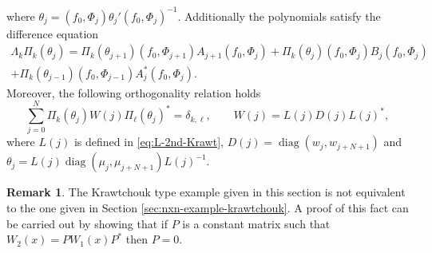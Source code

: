 \documentclass[a4paper,reqno]{amsart}
\DeclareMathOperator{\diag}{diag}
\theoremstyle{definition}
\newtheorem{remark}[theorem]{Remark}
\numberwithin{equation}{section}
\begin{document}
where $\theta_j=( f_0, \Phi_j) \theta_j'( f_0, \Phi_j)^{-1}.$ Additionally the polynomials satisfy  the difference equation 
\begin{multline}
\Lambda_k\Pi_k(\theta_j)=\Pi_k(\theta_{j+1})(f_0,\Phi_{j+1})A_{j+1}(f_0,\Phi_j)+\Pi_k(\theta_{j})(f_0,\Phi_{j})B_{j}(f_0,\Phi_j)\\+\Pi_k(\theta_{j-1})(f_0,\Phi_{j-1})A_{j}^\ast(f_0,\Phi_j). 
\end{multline}
Moreover, the following orthogonality relation holds
\begin{equation}
    \sum_{j=0}^N \Pi_{k}(\theta_j)W(j)\Pi_{\ell}(\theta_j)^\ast=\delta_{k,\ell}, \qquad W(j)=L(j)D(j)L(j)^\ast,
\end{equation} 
where $L(j)$ is defined in \eqref{eq:L-2nd-Krawt}, $D(j)=\diag(w_j,w_{j+N+1})$
and $\theta_j=L(j)\diag(\mu_j,\mu_{j+N+1})L(j)^{-1}.$

\begin{remark}
The Krawtchouk type example given in this section is not equivalent to the one given in Section \ref{sec:nxn-example-krawtchouk}. A proof of this fact can be carried out by showing that if $P$ is a constant matrix such that $W_2(x)=PW_1(x)P^\ast$ then $P=0.$
\end{remark}



\end{document}
